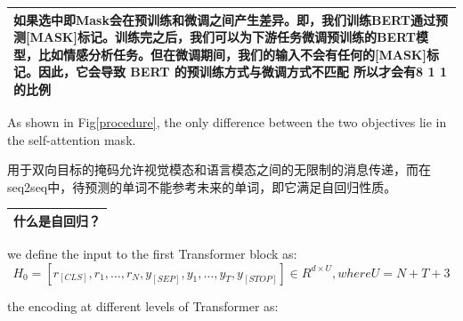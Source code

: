 \documentclass[a4paper]{article}
\begin{document}
\begin{sloppypar}
\begin{table}[!htbp]
            \centering
            \begin{tabularx}{\textwidth}{|X|}
                  \hline

                  \indent 如果选中即Mask会在预训练和微调之间产生差异。即，我们训练BERT通过预测[MASK]标记。训练完之后，我们可以为下游任务微调预训练的BERT模型，比如情感分析任务。但在微调期间，我们的输入不会有任何的[MASK]标记。因此，它会导致 BERT 的预训练方式与微调方式不匹配
                  所以才会有8 1 1的比例 \\
                  \hline
            \end{tabularx}%
            \label{tab:addlabel}%

      \end{table}%



      As shown in Fig\ref{procedure}, the only difference between the two objectives lie in the self-attention mask.

      用于双向目标的掩码允许视觉模态和语言模态之间的无限制的消息传递，而在seq2seq中，待预测的单词不能参考未来的单词，即它满足自回归性质。

      \begin{table}[!htbp]
            \renewcommand\arraystretch{2}

            \centering
            \begin{tabularx}{\textwidth}{|X|}
                  \hline
                  什么是自回归？
                  \\
                  \hline
            \end{tabularx}%

      \end{table}%

      we define the input to the first Transformer block as:
      \begin{equation}
            H_0 = [r_{[CLS]}, r_1, \dots, r_N, y_{[SEP]}, y_1, \dots, y_T, y_{[STOP]}] \in R^{d \times U},where U=N+T+3
            \label{auto-regressive}
      \end{equation}

      the encoding at different levels of Transformer as:


\end{sloppypar}
\end{document}
